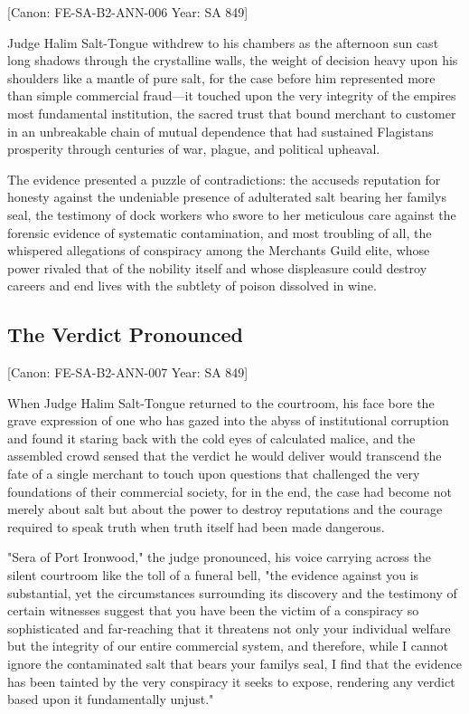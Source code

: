 {[}Canon: FE-SA-B2-ANN-006 \textbar{} Year: SA 849{]}

Judge Halim Salt-Tongue withdrew to his chambers as the afternoon sun
cast long shadows through the crystalline walls, the weight of decision
heavy upon his shoulders like a mantle of pure salt, for the case before
him represented more than simple commercial fraud---it touched upon the
very integrity of the empire\textquotesingle s most fundamental
institution, the sacred trust that bound merchant to customer in an
unbreakable chain of mutual dependence that had sustained
Flagistan\textquotesingle s prosperity through centuries of war, plague,
and political upheaval.

The evidence presented a puzzle of contradictions: the
accused\textquotesingle s reputation for honesty against the undeniable
presence of adulterated salt bearing her family\textquotesingle s seal,
the testimony of dock workers who swore to her meticulous care against
the forensic evidence of systematic contamination, and most troubling of
all, the whispered allegations of conspiracy among the
Merchant\textquotesingle s Guild elite, whose power rivaled that of the
nobility itself and whose displeasure could destroy careers and end
lives with the subtlety of poison dissolved in wine.

\subsection{The Verdict Pronounced}\label{the-verdict-pronounced}

{[}Canon: FE-SA-B2-ANN-007 \textbar{} Year: SA 849{]}

When Judge Halim Salt-Tongue returned to the courtroom, his face bore
the grave expression of one who has gazed into the abyss of
institutional corruption and found it staring back with the cold eyes of
calculated malice, and the assembled crowd sensed that the verdict he
would deliver would transcend the fate of a single merchant to touch
upon questions that challenged the very foundations of their commercial
society, for in the end, the case had become not merely about salt but
about the power to destroy reputations and the courage required to speak
truth when truth itself had been made dangerous.

"Sera of Port Ironwood," the judge pronounced, his voice carrying across
the silent courtroom like the toll of a funeral bell, "the evidence
against you is substantial, yet the circumstances surrounding its
discovery and the testimony of certain witnesses suggest that you have
been the victim of a conspiracy so sophisticated and far-reaching that
it threatens not only your individual welfare but the integrity of our
entire commercial system, and therefore, while I cannot ignore the
contaminated salt that bears your family\textquotesingle s seal, I find
that the evidence has been tainted by the very conspiracy it seeks to
expose, rendering any verdict based upon it fundamentally unjust."

